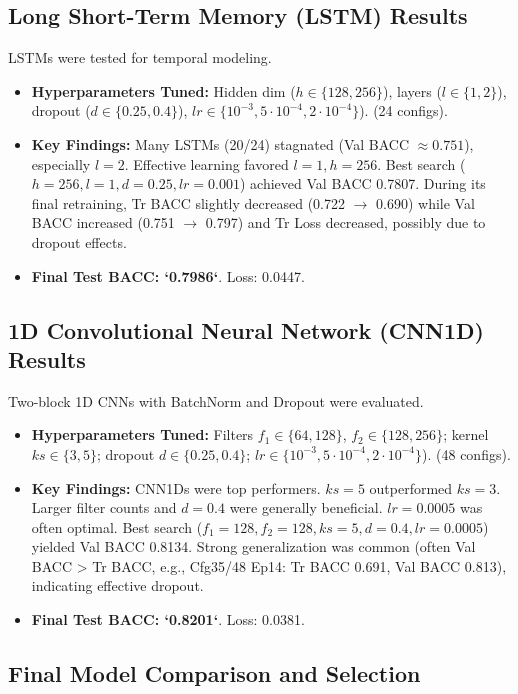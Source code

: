 \documentclass{article}
\begin{document}
\subsection{Long Short-Term Memory (LSTM) Results}
LSTMs were tested for temporal modeling.
\begin{itemize}
    \item \textbf{Hyperparameters Tuned:} Hidden dim ($h \in \{128, 256\}$), layers ($l \in \{1, 2\}$), dropout ($d \in \{0.25, 0.4\}$), $lr \in \{10^{-3}, 5 \cdot 10^{-4}, 2 \cdot 10^{-4}\}$). (24 configs).
    \item \textbf{Key Findings:} Many LSTMs (20/24) stagnated (Val BACC $\approx 0.751$), especially $l=2$. Effective learning favored $l=1, h=256$. Best search ($h=256, l=1, d=0.25, lr=0.001$) achieved Val BACC 0.7807. During its final retraining, Tr BACC slightly decreased (0.722 $\to$ 0.690) while Val BACC increased (0.751 $\to$ 0.797) and Tr Loss decreased, possibly due to dropout effects.
    \item \textbf{Final Test BACC: `0.7986`}. Loss: 0.0447.
\end{itemize}

\subsection{1D Convolutional Neural Network (CNN1D) Results}
\label{ssec:cnn1d_results}
Two-block 1D CNNs with BatchNorm and Dropout were evaluated.
\begin{itemize}
    \item \textbf{Hyperparameters Tuned:} Filters $f_1 \in \{64, 128\}$, $f_2 \in \{128, 256\}$; kernel $ks \in \{3, 5\}$; dropout $d \in \{0.25, 0.4\}$; $lr \in \{10^{-3}, 5 \cdot 10^{-4}, 2 \cdot 10^{-4}\}$). (48 configs).
    \item \textbf{Key Findings:} CNN1Ds were top performers. $ks=5$ outperformed $ks=3$. Larger filter counts and $d=0.4$ were generally beneficial. $lr=0.0005$ was often optimal. Best search ($f_1=128, f_2=128, ks=5, d=0.4, lr=0.0005$) yielded Val BACC 0.8134. Strong generalization was common (often Val BACC > Tr BACC, e.g., Cfg35/48 Ep14: Tr BACC 0.691, Val BACC 0.813), indicating effective dropout.
    \item \textbf{Final Test BACC: `0.8201`}. Loss: 0.0381.
\end{itemize}

\subsection{Final Model Comparison and Selection}
\end{document}
